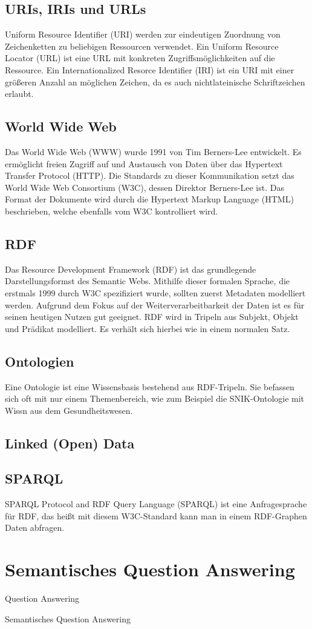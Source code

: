 \subsection{URIs, IRIs und URLs}
Uniform Resource Identifier (URI) werden zur eindeutigen Zuordnung von Zeichenketten zu beliebigen Ressourcen verwendet.
Ein Uniform Resource Locator (URL) ist eine URL mit konkreten Zugriffsmöglichkeiten auf die Ressource.
Ein Internationalized Resorce Identifier (IRI) ist ein URI mit einer größeren Anzahl an möglichen Zeichen, da es auch nichtlateinische Schriftzeichen erlaubt.

\subsection{World Wide Web}
Das World Wide Web (WWW) wurde 1991 von Tim Berners-Lee entwickelt.
Es ermöglicht freien Zugriff auf und Austausch von Daten über das Hypertext Transfer Protocol (HTTP).
Die Standards zu dieser Kommunikation setzt das World Wide Web Consortium (W3C), dessen Direktor Berners-Lee ist.
Das Format der Dokumente wird durch die Hypertext Markup Language (HTML) beschrieben, welche ebenfalls vom W3C kontrolliert wird.

\subsection{RDF}
Das Resource Development Framework (RDF) ist das grundlegende Darstellungsformst des Semantic Webs.
Mithilfe dieser formalen Sprache, die erstmals 1999 durch W3C spezifiziert wurde, sollten zuerst Metadaten modelliert werden.
Aufgrund dem Fokus auf der Weiterverarbeitbarkeit der Daten ist es für seinen heutigen Nutzen gut geeignet.
RDF wird in Tripeln aus Subjekt, Objekt und Prädikat modelliert. Es verhält sich hierbei wie in einem normalen Satz.

\subsection{Ontologien}
Eine Ontologie ist eine Wissensbasis bestehend aus RDF-Tripeln.
Sie befassen sich oft mit nur einem Themenbereich, wie zum Beispiel die SNIK-Ontologie mit Wissn aus dem Gesundheitswesen.

\subsection{Linked (Open) Data}


\subsection{SPARQL}
SPARQL Protocol and RDF Query Language (SPARQL) ist eine Anfragesprache für RDF, das heißt mit diesem W3C-Standard
kann man in einem RDF-Graphen Daten abfragen.

\section{Semantisches Question Answering}

\begin{definition}{Question Answering}

\end{definition}

\begin{definition}{Semantisches Question Answering}

\end{definition}
